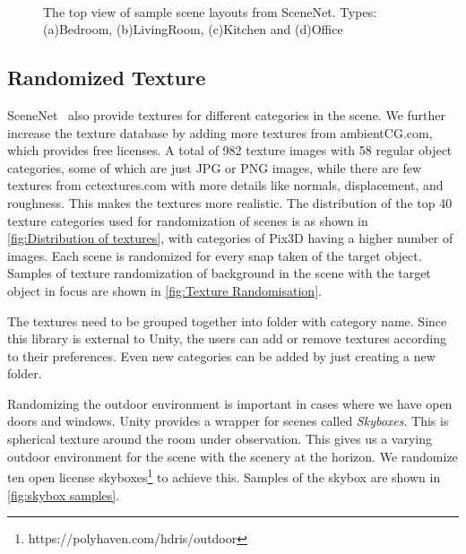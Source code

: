 \begin{figure}[!ht]
    \centering
    \quad
    \\
    \quad
    \caption{The top view of sample scene layouts from SceneNet. Types: (a)Bedroom, (b)LivingRoom, (c)Kitchen and (d)Office}
    \label{fig:Scene Types}
\end{figure}

\subsection{Randomized Texture}\label{subsec:randomised-texture}

SceneNet~\cite{McCormac2017} also provide textures for different categories in the scene.
We further increase the texture database by adding more textures from ambientCG.com, which provides free licenses.
A total of 982 texture images with 58 regular object categories, some of which are just JPG or PNG images, while there are few textures from cctextures.com with more details like normals, displacement, and roughness.
This makes the textures more realistic.
The distribution of the top 40 texture categories used for randomization of scenes is as shown in \autoref{fig:Distribution of textures}, with categories of Pix3D
having a higher number of images.
Each scene is randomized for every snap taken of the target object.
Samples of texture randomization of background in the scene with the target object in focus are shown in \autoref{fig:Texture Randomisation}.

The textures need to be grouped together into folder with category name.
Since this library is external to Unity, the users can add or remove textures according to their preferences.
Even new categories can be added by just creating a new folder.

Randomizing the outdoor environment is important in cases where we have open doors and windows.
Unity provides a wrapper for scenes called \emph{Skyboxes}.
This is spherical texture around the room under observation.
This gives us a varying outdoor environment for the scene with the scenery at the horizon.
We randomize ten open license skyboxes\footnote{https://polyhaven.com/hdris/outdoor} to achieve this.
Samples of the skybox are shown in \autoref{fig:skybox samples}.

